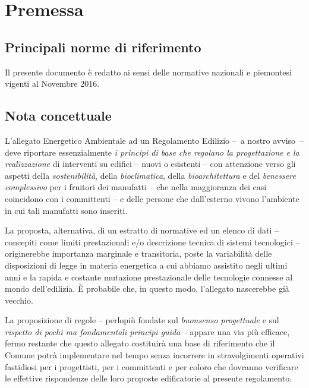 
\chapter{Premessa}
\label{chp:premessa}

\section{Principali norme di riferimento}
\label{sec:norme-riferimento-princ}

Il presente documento è redatto ai sensi delle  normative nazionali e piemontesi vigenti al Novembre 2016.

\section{Nota concettuale}
\label{sec:nota-import}

L'allegato Energetico Ambientale ad un Regolamento Edilizio –~a nostro avviso~– deve riportare essenzialmente \emph{i principi di base che regolano la progettazione e la realizzazione} di interventi su edifici – nuovi o esistenti – con attenzione verso gli aspetti della \emph{sostenibilità}, della \emph{bioclimatica}, della \emph{bioarchitettura} e del \emph{benessere complessivo} per i fruitori dei manufatti  – che nella maggioranza dei casi coincidono con i committenti – e delle persone che dall'esterno vivono l'ambiente in cui tali manufatti sono inseriti.

La proposta, alternativa, di un estratto di normative ed un elenco di dati – concepiti come limiti prestazionali e/o descrizione tecnica di sistemi tecnologici – originerebbe importanza marginale e transitoria, poste la variabilità delle disposizioni di legge in materia energetica a cui abbiamo assistito negli ultimi anni e la rapida e costante mutazione prestazionale delle tecnologie connesse al mondo dell'edilizia. È probabile che, in questo modo, l'allegato nascerebbe già vecchio. 

La proposizione di regole – perlopiù fondate sul \emph{buonsenso progettuale} e sul \emph{rispetto di pochi ma fondamentali principi guida} – appare una via più efficace,  fermo restante che questo allegato costituirà una base di riferimento che il Comune potrà implementare  nel tempo senza incorrere in stravolgimenti operativi fastidiosi per i progettisti, per i committenti e per coloro che dovranno verificare le effettive rispondenze delle loro proposte edificatorie al presente regolamento.



